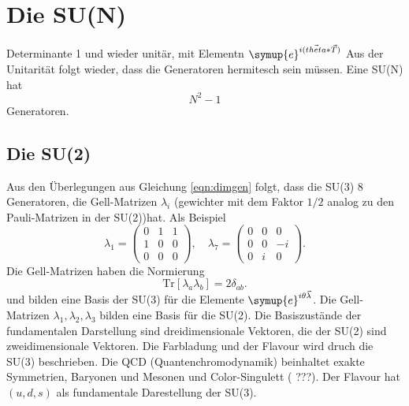 \documentclass[
  captions=tableheading,  %
  titlepage=firstiscover, %
]{scrartcl}
\begin{document}
\section{Die SU(N)}
Determinante 1 und wieder unitär, mit Elementn 
$\symup{e}^{i(\vec{theta} * \vec{{T}})}$
Aus der Unitarität folgt wieder, dass die Generatoren hermitesch sein müssen.
Eine SU(N) hat
\begin{equation*}
  N^2 - 1 \label{eqn:dimgen}
\end{equation*}
Generatoren.
\subsection{Die SU(2)}
Aus den Überlegungen aus Gleichung \eqref{eqn:dimgen} folgt, dass die 
SU(3) 8 Generatoren, die Gell-Matrizen $\lambda_i$ (gewichter mit dem Faktor $1/2$ analog 
zu den Pauli-Matrizen in der SU(2))hat.
Als Beispiel
\begin{equation*}
  \lambda_1 = 
  \begin{pmatrix}
    0 & 1 & 1 \\
    1 & 0 & 0 \\ 
    0 & 0 & 0 
  \end{pmatrix} ,\quad 
  \lambda_7 = 
  \begin{pmatrix}
    0 & 0 & 0 \\
    0 & 0 & -i\\
    0 & i & 0
  \end{pmatrix}.
\end{equation*}
Die Gell-Matrizen haben die Normierung 
\begin{equation*}
  \text{Tr}[\lambda_a \lambda_b] = 2 \delta_{ab} .
\end{equation*}
und bilden eine Basis der SU(3) für die Elemente $\symup{e}^{i \theta \vec{\lambda}}$.
Die Gell-Matrizen $\lambda_1, \lambda_2, \lambda_3$ bilden eine Basis für 
die SU(2).
Die Basiszustände der fundamentalen Darstellung sind dreidimensionale Vektoren, die der SU(2) sind 
zweidimensionale Vektoren.
Die Farbladung und der Flavour wird druch die SU(3) beschrieben.
Die QCD (Quantenchromodynamik) beinhaltet exakte Symmetrien, Baryonen und Mesonen und Color-Singulett ({\color{red} ???}).
Der Flavour hat $(u, d, s)$ als fundamentale Darestellung der SU(3).
\end{document}
